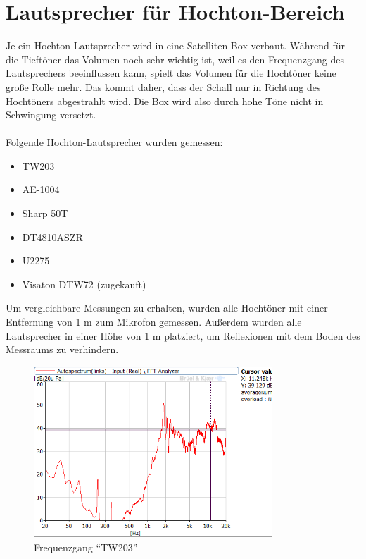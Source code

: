 \newpage
\section{Lautsprecher für Hochton-Bereich}\label{sec:4.3}
Je ein Hochton-Lautsprecher wird in eine Satelliten-Box verbaut.
Während für die Tieftöner das Volumen noch sehr wichtig ist, weil es den Frequenzgang des Lautsprechers beeinflussen kann, spielt das Volumen für die Hochtöner keine große Rolle mehr.
Das kommt daher, dass der Schall nur in Richtung des Hochtöners abgestrahlt wird.
Die Box wird also durch hohe Töne nicht in Schwingung versetzt.
\\ \\
Folgende Hochton-Lautsprecher wurden gemessen:
\begin{itemize}
	\item TW203
	\item AE-1004
	\item Sharp 50T
	\item DT4810ASZR
	\item U2275
	\item Visaton DTW72 (zugekauft)
\end{itemize}
Um vergleichbare Messungen zu erhalten, wurden alle Hochtöner mit einer Entfernung von 1 m zum Mikrofon gemessen.
Außerdem wurden alle Lautsprecher in einer Höhe von 1 m platziert, um Reflexionen mit dem Boden des Messraums zu verhindern.
\newpage

\begin{figure} [H]
	\centering
	\includegraphics[width=0.8\textwidth]{img/LSMessung/HT/TW203_1m_erhoeht.png}
	\caption{Frequenzgang \enquote{TW203}}
	\label{fig:4.3.1}
\end{figure}

